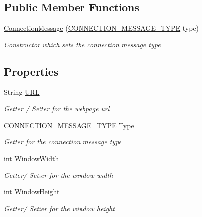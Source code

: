 \subsection*{Public Member Functions}
\begin{DoxyCompactItemize}
\item 
\hyperlink{class_web_analyzer_1_1_models_1_1_message_model_1_1_connection_message_a28b97882765f7759b31981ef271deaf3}{Connection\+Message} (\hyperlink{class_web_analyzer_1_1_models_1_1_message_model_1_1_connection_message_a0b8ebc456d3aed9c51235f2a1a1a1cdb}{C\+O\+N\+N\+E\+C\+T\+I\+O\+N\+\_\+\+M\+E\+S\+S\+A\+G\+E\+\_\+\+T\+Y\+P\+E} type)
\begin{DoxyCompactList}\small\item\em Constructor which sets the connection message type \end{DoxyCompactList}\end{DoxyCompactItemize}
\subsection*{Properties}
\begin{DoxyCompactItemize}
\item 
String \hyperlink{class_web_analyzer_1_1_models_1_1_message_model_1_1_connection_message_afc9df7636f98ce36f983c89db64f1c6a}{U\+R\+L}
\begin{DoxyCompactList}\small\item\em Getter / Setter for the webpage url \end{DoxyCompactList}\item 
\hyperlink{class_web_analyzer_1_1_models_1_1_message_model_1_1_connection_message_a0b8ebc456d3aed9c51235f2a1a1a1cdb}{C\+O\+N\+N\+E\+C\+T\+I\+O\+N\+\_\+\+M\+E\+S\+S\+A\+G\+E\+\_\+\+T\+Y\+P\+E} \hyperlink{class_web_analyzer_1_1_models_1_1_message_model_1_1_connection_message_a74c569109e3a9d19130c36fa9628a5f5}{Type}
\begin{DoxyCompactList}\small\item\em Getter for the connection message type \end{DoxyCompactList}\item 
int \hyperlink{class_web_analyzer_1_1_models_1_1_message_model_1_1_connection_message_ad41b2edd499a0085aefa4ab180de9dc7}{Window\+Width}
\begin{DoxyCompactList}\small\item\em Getter/ Setter for the window width \end{DoxyCompactList}\item 
int \hyperlink{class_web_analyzer_1_1_models_1_1_message_model_1_1_connection_message_a945ce5486695eaed31e71e0e11e0dc64}{Window\+Height}
\begin{DoxyCompactList}\small\item\em Getter/ Setter for the window height \end{DoxyCompactList}\end{DoxyCompactItemize}
